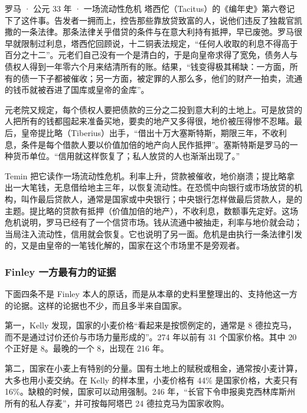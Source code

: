 \begin{case}{罗马 · 公元 33 年 · 一场流动性危机}
塔西佗（Tacitus）的《编年史》第六卷记下了这件事。告发者一拥而上，控告那些靠放贷致富的人，说他们违反了独裁官凯撒的一条法律。那条法律关乎借贷的条件与在意大利持有抵押，早已废弛\cite{tacitus}。罗马很早就限制过利息，塔西佗回顾说，十二铜表法规定，“任何人收取的利息不得高于百分之十二”。元老们自己没有一个是清白的，于是向皇帝求得了宽免，债务人与债权人得到一年零六个月来结清所有的账。结果，“钱变得极其稀缺：一方面，所有的债一下子都被催收；另一方面，被定罪的人那么多，他们的财产一拍卖，流通的钱币就被吞进了国库或皇帝的金库”\cite{tacitus}。

元老院又规定，每个债权人要把债款的三分之二投到意大利的土地上。可是放贷的人把所有的钱都囤起来准备买地，要卖的地产又多得很，地价被压得惨不忍睹\cite{tacitus}。最后，皇帝提比略（Tiberius）出手，“借出十万大塞斯特斯，期限三年，不收利息，条件是每个借款人要以价值加倍的地产向人民作抵押”。塞斯特斯是罗马的一种货币单位。“信用就这样恢复了；私人放贷的人也渐渐出现了。”\cite{tacitus}

Temin 把它读作一场流动性危机。利率上升，贷款被催收，地价崩溃；提比略拿出一大笔钱，无息借给地主三年，以恢复流动性\cite{temin2001}。在恐慌中向银行或市场放贷的机构，叫作最后贷款人，通常是国家或中央银行；中央银行怎样做最后贷款人，是的主题。提比略的贷款有抵押（价值加倍的地产），不收利息，数额事先定好。这场危机说明，罗马已经有了一个信贷市场。钱从流通中被抽走，利率与地价就会动；当局注入流动性，信用就会恢复。它也说明了另一面。危机是由执行一条法律引发的，又是由皇帝的一笔钱化解的，国家在这个市场里不是旁观者。
\end{case}

\subsubsection{Finley 一方最有力的证据}
下面四条不是 Finley 本人的原话，而是从本章的史料里整理出的、支持他这一方的论据。这样的论据也不少，而且多半来自国家。

第一，Kelly 发现，国家的小麦价格“看起来是按惯例定的，通常是 8 德拉克马，而不是通过讨价还价与市场力量形成的”\cite{kelly2021}。274 年以前有 31 个国家价格。其中 20 个正好是 8。最晚的一个 8，出现在 216 年。

第二，国家在小麦上有特别的分量。国有土地上的赋税或租金，通常按小麦计算，大多也用小麦交纳\cite{kelly2021}。在 Kelly 的样本里，小麦价格有 44\% 是国家价格，大麦只有 16\%。缺粮的时候，国家可以动用强制。246 年，“长官下令申报奥克西林库斯州所有的私人存麦”，并可按每阿塔巴 24 德拉克马为国家收购\cite{kelly2021}。

